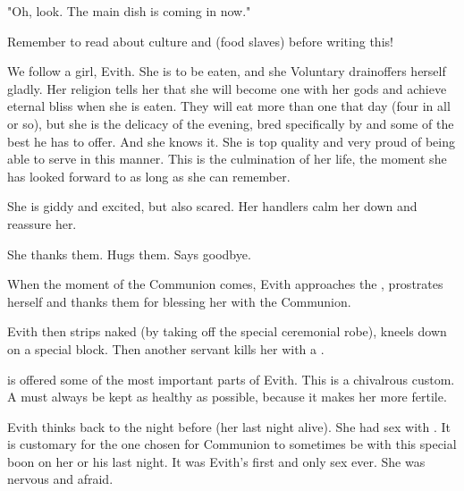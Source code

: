 "Oh, look. 
 The main dish is coming in now."









\begin{comment}
\subsection{Evith}
\end{comment}
\new
Remember to read about {\resphan} culture and {\naor}{\naorim{} (food slaves)} before writing this!

We follow a {\naor} girl, {Evith}. 
She is to be eaten, and she {Voluntary drain}{offers herself gladly}. 
Her religion tells her that she will become one with her gods and achieve eternal bliss when she is eaten. 
They will eat more than one \human{} that day (four in all or so), but she is the delicacy of the evening, bred specifically by \Teshrial{} and some of the best he has to offer. 
And she knows it. 
She is top quality and very proud of being able to serve in this manner. 
This is the culmination of her life, the moment she has looked forward to as long as she can remember. 

She is giddy and excited, but also scared. 
Her handlers calm her down and reassure her. 
\begin{prose}

  She thanks them. 
  Hugs them. 
  Says goodbye. 
\end{prose}

When the moment of the {Communion} comes, Evith approaches the \resphain{}, prostrates herself and thanks them for blessing her with the Communion. 

Evith then strips naked (by taking off the special ceremonial robe), kneels down on a special block. 
Then another servant kills her with a {\gelveir}. 

\Firaxel{} is offered some of the most important parts of Evith. 
This is a chivalrous custom. 
A \resvil{} must always be kept as healthy as possible, because it makes her more fertile. 

Evith thinks back to the night before (her last night alive). 
She had sex with \Teshrial. 
It is customary for the one chosen for Communion to sometimes be \honoured with this special boon on her or his last night. 
It was Evith's first and only sex ever. 
She was nervous and afraid. 

